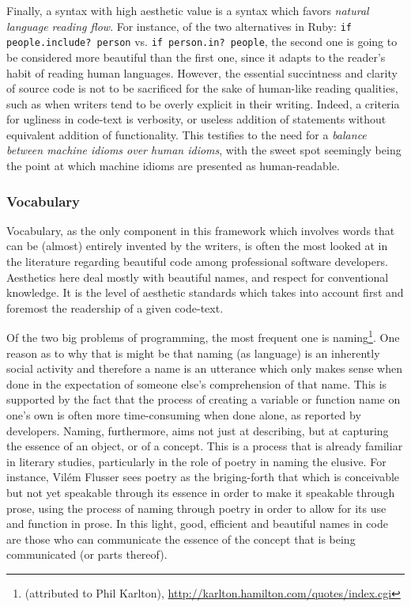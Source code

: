 Finally, a syntax with high aesthetic value is a syntax which favors \emph{natural language reading flow}. For instance, of the two alternatives in Ruby: \lstinline{if people.include? person} vs. \lstinline{if person.in? people}, the second one is going to be considered more beautiful than the first one, since it adapts to the reader's habit of reading human languages. However, the essential succintness and clarity of source code is not to be sacrificed for the sake of human-like reading qualities, such as when writers tend to be overly explicit in their writing. Indeed, a criteria for ugliness in code-text is verbosity, or useless addition of statements without equivalent addition of functionality. This testifies to the need for a \emph{balance between machine idioms over human idioms}, with the sweet spot seemingly being the point at which machine idioms are presented as human-readable.

\subsubsection{Vocabulary}
\label{subsubsec:framework-vocabulary}

Vocabulary, as the only component in this framework which involves words that can be (almost) entirely invented by the writers, is often the most looked at in the literature regarding beautiful code among professional software developers. Aesthetics here deal mostly with beautiful names, and respect for conventional knowledge. It is the level of aesthetic standards which takes into account first and foremost the readership of a given code-text.

Of the two big problems of programming, the most frequent one is naming\footnote{(attributed to Phil Karlton), \url{http://karlton.hamilton.com/quotes/index.cgi}}. One reason as to why that is might be that naming (as language) is an inherently social activity \citep{voloshinov_marxism_1986} and therefore a name is an utterance which only makes sense when done in the expectation of someone else's comprehension of that name. This is supported by the fact that the process of creating a variable or function name on one's own is often more time-consuming when done alone, as reported by developers. Naming, furthermore, aims not just at describing, but at capturing the essence of an object, or of a concept. This is a process that is already familiar in literary studies, particularly in the role of poetry in naming the elusive. For instance, Vilém Flusser sees poetry as the briging-forth that which is conceivable but not yet speakable through its essence in order to make it speakable through prose, using the process of naming through poetry in order to allow for its use and function in prose. In this light, good, efficient and beautiful names in code are those who can communicate the essence of the concept that is being communicated (or parts thereof).

